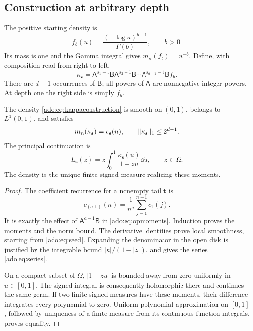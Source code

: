 \subsection{Construction at arbitrary depth}
The positive starting density is
\begin{equation}\label{ado:eq:seed}
 f_b(u)=\frac{(-\log u)^{b-1}}{\Gamma(b)},\qquad b>0.
\end{equation}
Its mass is one and the Gamma integral gives $m_n(f_b)=n^{-b}$.
Define, with composition read from right to left,
\begin{equation}\label{ado:eq:kappaconstruction}
 \kappa_{\boldsymbol{s}}
 =\mathsf{A}^{s_1-1}\mathsf{B}\mathsf{A}^{s_2-1}\mathsf{B}\cdots
       \mathsf{A}^{s_{d-1}-1}\mathsf{B} f_b.
\end{equation}
There are $d-1$ occurrences of $\mathsf{B}$; all powers of $\mathsf{A}$ are
nonnegative integer powers. At depth one the right side is simply $f_b$.

\begin{proposition}
\label{ado:prop:realization}
The density \eqref{ado:eq:kappaconstruction} is smooth on $(0,1)$,
belongs to $L^1(0,1)$, and satisfies
\begin{equation}\label{ado:eq:moments}
 m_n(\kappa_{\boldsymbol{s}})=c_{\boldsymbol{s}}(n),\qquad
 \lVert\kappa_{\boldsymbol{s}}\rVert_1\le2^{d-1}.
\end{equation}
The principal continuation is
\begin{equation}\label{ado:eq:signedtransform}
 L_{\boldsymbol{s}}(z)=z\int_0^1\frac{\kappa_{\boldsymbol{s}}(u)}{1-zu}\dd u,
 \qquad z\in\Omega.
\end{equation}
The density is the unique finite signed measure realizing these moments.
\end{proposition}
\begin{proof}
The coefficient recurrence for a nonempty tail $\boldsymbol{t}$ is
\[
 c_{(a,\boldsymbol{t})}(n)
 =\frac1{n^a}\sum_{j=1}^{n-1}c_{\boldsymbol{t}}(j).
\]
It is exactly the effect of $\mathsf{A}^{a-1}\mathsf{B}$ in
\eqref{ado:eq:opmoments}. Induction proves the moments and the norm
bound. The derivative identities prove local smoothness, starting from
\eqref{ado:eq:seed}. Expanding the denominator in the open disk is
justified by the integrable bound $|\kappa|/(1-|z|)$, and gives the
series \eqref{ado:eq:series}.

On a compact subset of $\Omega$, $|1-zu|$ is bounded away from zero
uniformly in $u\in[0,1]$. The signed integral is consequently holomorphic
there and continues the same germ. If two finite signed measures have
these moments, their difference integrates every polynomial to zero.
Uniform polynomial approximation on $[0,1]$, followed by uniqueness of
a finite measure from its continuous-function integrals, proves equality.
\end{proof}

